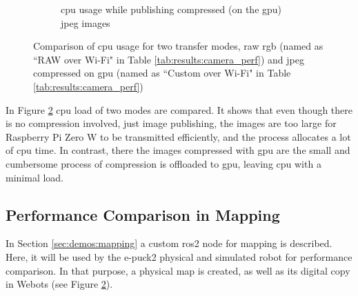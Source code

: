 \begin{figure}[H]
\begin{subfigure}{.8\textwidth}
  \caption{\ac{cpu} usage while publishing compressed (on the \ac{gpu}) \ac{jpeg} images}
  \label{fig:results:camera_load:jpeg_gpu}
\end{subfigure}
\caption[Comparison of \ac{cpu} usage for two transfer modes, raw \ac{rgb} and \ac{jpeg} compressed on \ac{gpu}]{Comparison of \ac{cpu} usage for two transfer modes, raw \ac{rgb} (named as ``RAW over Wi-Fi" in Table \ref{tab:results:camera_perf}) and \ac{jpeg} compressed on \ac{gpu} (named as ``Custom over Wi-Fi" in Table \ref{tab:results:camera_perf})}
\label{fig:results:camera_load}
\end{figure}

In Figure \ref{fig:results:camera_load} \ac{cpu} load of two modes are compared.
It shows that even though there is no compression involved, just image publishing, the images are too large for Raspberry Pi Zero W to be transmitted efficiently, and the process allocates a lot of \ac{cpu} time.
In contrast, there the images compressed with \ac{gpu} are the small and cumbersome process of compression is offloaded to \ac{gpu}, leaving \ac{cpu} with a minimal load.

\subsection{Performance Comparison in Mapping}
In Section \ref{sec:demos:mapping} a custom \ac{ros2} node for mapping is described. Here, it will be used by the e-puck2 physical and simulated robot for performance comparison. In that purpose, a physical map is created, as well as its digital copy in Webots (see Figure \ref{fig:results:camera_load}).

